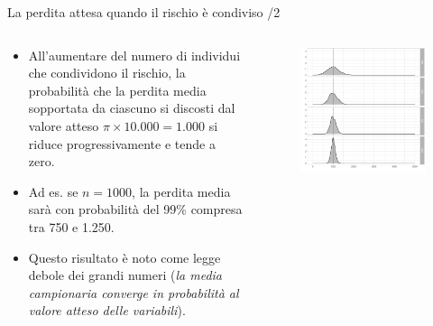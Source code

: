 \documentclass[aspectratio=149,11pt]{beamer}
\begin{document}
\begin{frame}{La perdita attesa quando il rischio è condiviso /2}
\begin{columns}
\begin{column}{.4\columnwidth}
\small
\begin{itemize}
\item All'aumentare del numero di individui che
condividono il rischio, la probabilità che la perdita media sopportata da
ciascuno si discosti dal valore atteso \(\pi \times 10.000 = 1.000\) si
riduce progressivamente e tende a zero.
\item Ad es. se \(n=1000\), la perdita media sarà con probabilità del 99\% compresa
tra 750 e 1.250.
\item Questo risultato è noto come \alert{legge debole dei grandi numeri} (\emph{la media
campionaria converge in probabilità al valore atteso delle variabili}).
\end{itemize}
\end{column}
\begin{column}{.6\columnwidth}
\begin{figure}[htbp]
\centering
\includegraphics[width=\textwidth]{./figure/distribuzione-perdite-2.pdf}
\end{figure}
\end{column}
\end{columns}
\end{frame}
\end{document}
